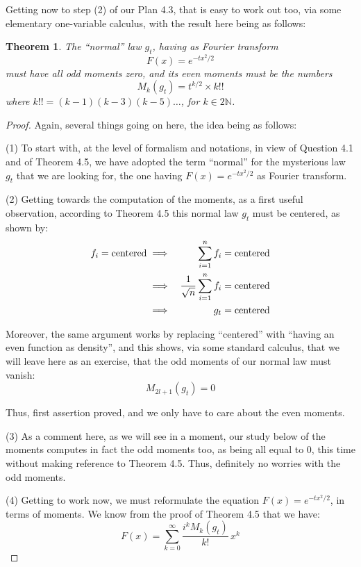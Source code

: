 \documentclass[12pt]{amsbook}
\newtheorem{theorem}{Theorem}[chapter]
\begin{document}
Getting now to step (2) of our Plan 4.3, that is easy to work out too, via some elementary one-variable calculus, with the result here being as follows:

\begin{theorem}
The ``normal'' law $g_t$, having as Fourier transform 
$$F(x)=e^{-tx^2/2}$$
must have all odd moments zero, and its even moments must be the numbers
$$M_k(g_t)=t^{k/2}\times k!!$$
where $k!!=(k-1)(k-3)(k-5)\ldots$, for $k\in2\mathbb N$. 
\end{theorem}

\begin{proof}
Again, several things going on here, the idea being as follows:

\medskip

(1) To start with, at the level of formalism and notations, in view of Question 4.1 and of Theorem 4.5, we have adopted the term ``normal'' for the mysterious law $g_t$ that we are looking for, the one having $F(x)=e^{-tx^2/2}$ as Fourier transform. 

\medskip

(2) Getting towards the computation of the moments, as a first useful observation, according to Theorem 4.5 this normal law $g_t$ must be centered, as shown by:
\begin{eqnarray*}
f_i={\rm centered}
&\implies&\sum_{i=1}^nf_i={\rm centered}\\
&\implies&\frac{1}{\sqrt{n}}\sum_{i=1}^nf_i={\rm centered}\\
&\implies&g_t={\rm centered}
\end{eqnarray*}

Moreover, the same argument works by replacing ``centered'' with ``having an even function as density'', and this shows, via some standard calculus, that we will leave here as an exercise, that the odd moments of our normal law must vanish:
$$M_{2l+1}(g_t)=0$$

Thus, first assertion proved, and we only have to care about the even moments. 

\medskip

(3) As a comment here, as we will see in a moment, our study below of the moments computes in fact the odd moments too, as being all equal to 0, this time without making reference to Theorem 4.5. Thus, definitely no worries with the odd moments.

\medskip

(4) Getting to work now, we must reformulate the equation $F(x)=e^{-tx^2/2}$, in terms of moments. We know from the proof of Theorem 4.5 that we have:
$$F(x)=\sum_{k=0}^\infty\frac{i^kM_k(g_t)}{k!}\,x^k$$


\end{proof}
\end{document}
